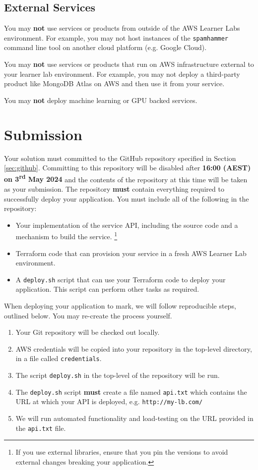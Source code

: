 \documentclass{csse4400}
\begin{document}
\subsection{External Services}
You may \textbf{not} use services or products from outside of the AWS Learner Labs environment.
For example, you may not host instances of the \texttt{spamhammer} command line tool on another cloud platform
(e.g. Google Cloud).

You may \textbf{not} use services or products that run on AWS infrastructure external to your learner lab environment.
For example, you may not deploy a third-party product like MongoDB Atlas on AWS and then use it from your service.

You may \textbf{not} deploy machine learning or GPU backed services.

\section{Submission}
Your solution must committed to the GitHub repository specified in Section \ref{sec:github}.
Committing to this repository will be disabled after \textbf{16:00 (AEST) on 3\textsuperscript{rd} May 2024} and the contents of the repository at this time will be taken as your submission.
The repository \textbf{must} contain everything required to successfully deploy your application.
You must include all of the following in the repository:
\begin{itemize}
  \item Your implementation of the service API, including the source code and a mechanism to build the service.%
  \footnote{If you use external libraries, ensure that you pin the versions to avoid external changes breaking your application.}
  \item Terraform code that can provision your service in a fresh AWS Learner Lab environment.
  \item A \texttt{deploy.sh} script that can use your Terraform code to deploy your application.
    This script can perform other tasks as required.
\end{itemize}

When deploying your application to mark, we will follow reproducible steps, outlined below. You may re-create the process yourself.

\begin{enumerate}
  \item Your Git repository will be checked out locally.
  \item AWS credentials will be copied into your repository in the top-level directory,
  in a file called \texttt{credentials}.
  \item The script \texttt{deploy.sh} in the top-level of the repository will be run.
  \item The \texttt{deploy.sh} script \textbf{must} create a file named \texttt{api.txt} which contains the URL at which your API is deployed, e.g. \texttt{http://my-lb.com/}
  \item We will run automated functionality and load-testing on the URL provided in the \texttt{api.txt} file.
\end{enumerate}
\end{document}
